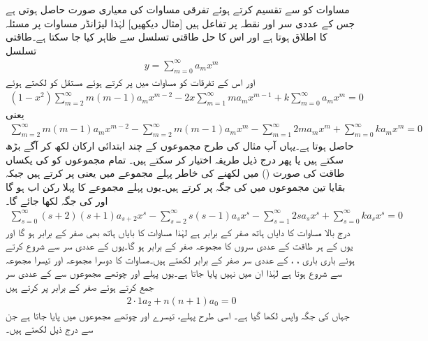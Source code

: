 مساوات  کو  سے تقسیم کرتے ہوئے تفرقی مساوات کی معیاری صورت حاصل ہوتی ہے جس کے عددی
 سر  اور  نقطہ  پر  تفاعل ہیں [مثال  دیکھیں] لہٰذا لیژانڈر مساوات پر مسئلہ  کا اطلاق ہوتا ہے اور اس کا حل طاقتی تسلسل سے ظاہر کیا جا سکتا ہے۔طاقتی تسلسل
\begin{align}\label{مساوات_بیسل_لیژانڈر_حل_الف}
y=\sum_{m=0}^{\infty}a_mx^m
\end{align}
اور اس کے تفرقات کو مساوات  میں پر کرتے  ہوئے مستقل  کو  لکھتے ہوئے
\begin{align*}
(1-x^2)\sum_{m=2}^{\infty}m(m-1)a_mx^{m-2}-2x\sum_{m=1}^{\infty}ma_mx^{m-1}+k\sum_{m=0}^{\infty}a_mx^m=0
\end{align*}
یعنی
\begin{align*}
\sum_{m=2}^{\infty}m(m-1)a_mx^{m-2}-\sum_{m=2}^{\infty}m(m-1)a_mx^m-\sum_{m=1}^{\infty}2ma_mx^{m}+\sum_{m=0}^{\infty}ka_mx^m=0
\end{align*}
حاصل ہوتا ہے۔یہاں آپ مثال  کی طرح مجموعوں کے چند ابتدائی ارکان لکھ کر آگے بڑھ سکتے ہیں یا پھر درج ذیل طریقہ اختیار کر سکتے ہیں۔ تمام مجموعوں کو   کی یکساں طاقت کی صورت () میں لکھنے کی خاطر پہلے مجموعے میں  یعنی  پر کرتے ہیں جبکہ بقایا تین مجموعوں میں  کی جگہ  پر کرتے ہیں۔یوں پہلے مجموعے کا پہلا رکن  اب  ہو گا اور  کی جگہ  لکھا جائے گا۔
\begin{align}\label{مساوات_بیسل_لیژانڈر_ب}
\sum_{s=0}^{\infty}(s+2)(s+1)a_{s+2}x^{s}-\sum_{s=2}^{\infty}s(s-1)a_sx^s-\sum_{s=1}^{\infty}2s a_sx^s+\sum_{s=0}^{\infty}ka_s x^s=0
\end{align}
درج بالا مساوات کا دایاں ہاتھ صفر کے برابر ہے لہٰذا مساوات کا بایاں ہاتھ بھی صفر کے برابر ہو گا اور یوں  کے ہر طاقت کے عددی سروں کا مجموعہ صفر کے برابر ہو گا۔یوں  کے عددی سر سے شروع کرتے ہوئے باری باری ، ،  کے عددی سر صفر کے برابر لکھتے ہیں۔مساوات  کا دوسرا مجموعہ  اور تیسرا مجموعہ  سے شروع ہوتا ہے لہٰذا ان میں  نہیں پایا جاتا ہے۔یوں پہلے اور چوتھے مجموعوں سے  کے عددی سر جمع کرتے ہوئے صفر کے برابر پر کرتے ہیں
\begin{align}\label{مساوات_بیسل_لیژانڈر_پ}
2 \cdot 1 a_2+n(n+1)a_0=0
\end{align}
جہاں  کی جگہ واپس  لکھا گیا ہے۔ اسی طرح  پہلے، تیسرے اور چوتھے مجموعوں میں پایا جاتا ہے جن سے درج ذیل لکھتے ہیں۔
